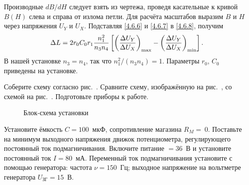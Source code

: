 Производные $dB/dH$ следует взять из чертежа, проведя касательные к кривой
$B(H)$ слева и справа от излома петли. Для расчёта масштабов выразим $B$ и $H$
через напряжения $U_Y$ и $U_X$. Подставляя \eqref{4.6.6} и \eqref{4.6.7} в
\eqref{4.6.8}, получим
\begin{equation}
	\eqmark{4.6.9}
	\Delta L = 2r_0C_0r_1\frac{n^2_1}{n_3n_4}\left[\left(\frac{\Delta
U_Y}{\Delta U_X}\right)_{\rm max} - \left(\frac{\Delta U_Y}{\Delta
U_X}\right)_{\rm min}\right].
\end{equation}
В нашей установке $n_3 = n_4$, так что $n_1^2/ (n_3n_4) = 1$. Параметры $r_0$,
$C_0$ приведены на установке.

\begin{lab:task}


\item
Соберите схему согласно рис.~. Сравните схему, изображённую
на рис.~, со схемой на рис.~. Подготовьте приборы к работе.
\begin{figure}[h!]
\centering
	\caption{Блок-схема установки}
\end{figure}

\item
Установите ёмкость $C = 100$~мкФ, сопротивление магазина $R_M =~0.$ Поставьте на
минимум выходного напряжения движок потенциометра, регулирующего постоянный ток
подмагничивания. Включите питание $= 36$~В и установите постоянный ток $I
=80$~мА. Переменный ток подмагничивания установите с помощью генератора: частота
$\nu = 150$~Гц; выходное напряжение на вольтметре генератора $U_\text{ЗГ} =
15$~В.


\end{lab:task}

